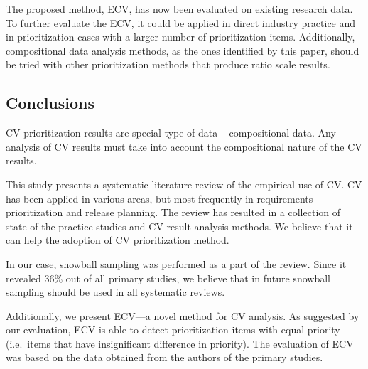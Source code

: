 The proposed method, ECV, has now been evaluated on existing research data. To further evaluate the ECV, it could be applied in direct industry practice and in prioritization cases with a larger number of prioritization items.
Additionally, compositional data analysis methods, as the ones identified by this paper, should be tried with other prioritization methods that produce ratio scale results.

\subsection{Conclusions}
CV prioritization results are special type of data -- compositional data.
Any analysis of CV results must take into account the compositional nature of the CV results.

This study presents a systematic literature review of the empirical use of CV.
CV has been applied in various areas, but most frequently in requirements prioritization and release planning.
The review has resulted in a collection of state of the practice studies and CV result analysis methods.
We believe that it can help the adoption of CV prioritization method.

In our case, snowball sampling was performed as a part of the review.
Since it revealed 36\% out of all primary studies, 
we believe that in future snowball sampling should be used in all systematic reviews.

Additionally, we present ECV---a novel method for CV analysis.
As suggested by our evaluation, ECV is able to detect prioritization items with equal priority (i.e.\ items that have insignificant difference in priority).
The evaluation of ECV was based on the data obtained from the authors of the primary studies.